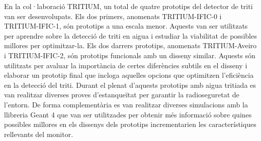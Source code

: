 En la col·laboració TRITIUM, un total de quatre prototips del detector de triti van ser desenvolupats. Els dos primers, anomenats TRITIUM-IFIC-0 i TRITIUM-IFIC-1, són prototips a una escala menor. Aquests van ser utilitzats per aprendre sobre la detecció de triti en aigua i estudiar la viabilitat de possibles millores per optimitzar-la. Els dos darrers prototips, anomenats TRITIUM-Aveiro i TRITIUM-IFIC-2, són prototips funcionals amb un disseny similar. Aquests són utilitzats per avaluar la importància de certes diferències subtils en el disseny i elaborar un prototip final que incloga aquelles opcions que optimitzen l'eficiència en la detecció del triti. Durant el plenat d'aquests prototips amb aigua tritiada es van realitzar diverses proves d'estanqueïtat per garantir la radioseguretat de l'entorn. De forma complementària es van realitzar diverses simulacions amb la llibreria Geant 4 \cite{Geant4WebPage} que van ser utilitzades per obtenir més informació sobre quines possibles millores en els dissenys dels prototips incrementarien les característiques rellevants del monitor.